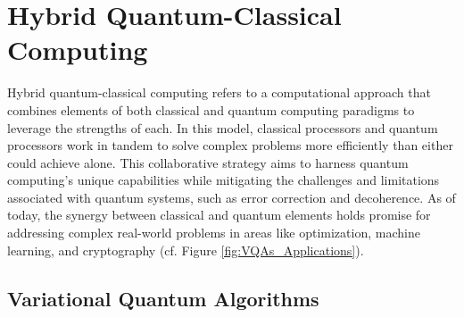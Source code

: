 




\section{Hybrid Quantum-Classical Computing}
\label{section:HQCC}


Hybrid quantum-classical computing refers to a computational approach that combines elements of both classical and quantum computing paradigms to leverage the strengths of each. In this model, classical processors and quantum processors work in tandem to solve complex problems more efficiently than either could achieve alone. This collaborative strategy aims to harness quantum computing's unique capabilities while mitigating the challenges and limitations associated with quantum systems, such as error correction and decoherence. As of today, the synergy between classical and quantum elements holds promise for addressing complex real-world problems in areas like optimization, machine learning, and cryptography (cf. Figure \ref{fig:VQAs_Applications}).

\subsection{Variational Quantum Algorithms}
\label{subsection:VQA}

